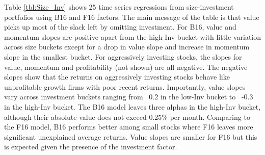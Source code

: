 
Table \ref{tbl:Size_Inv} shows 25 time series regressions from size-investment
portfolios using B16 and F16 factors.
The main message of the table is that value picks up most of the slack left by
omitting investment.
For B16, value and momentum slopes are positive apart from the high-Inv bucket
with little variation across size buckets except for a drop in value slope and
increase in momentum slope in the smallest bucket.
For aggressively investing stocks, the slopes for value, momentum and
profitability (not shown) are all negative.
The negative slopes show that the returns on aggressively investing stocks
behave like unprofitable growth firms with poor recent returns.
Importantly, value slopes vary across investment buckets ranging from ~0.2 in
the low-Inv bucket to ~-0.3 in the high-Inv bucket.
The B16 model leaves three alphas in the high-Inv bucket,
although their absolute value does not exceed 0.25\% per month.
Comparing to the F16 model, B16 performs better among small stocks where F16
leaves more significant unexplained average returns.
Value slopes are smaller for F16 but this is expected given the presence of the
investment factor.

